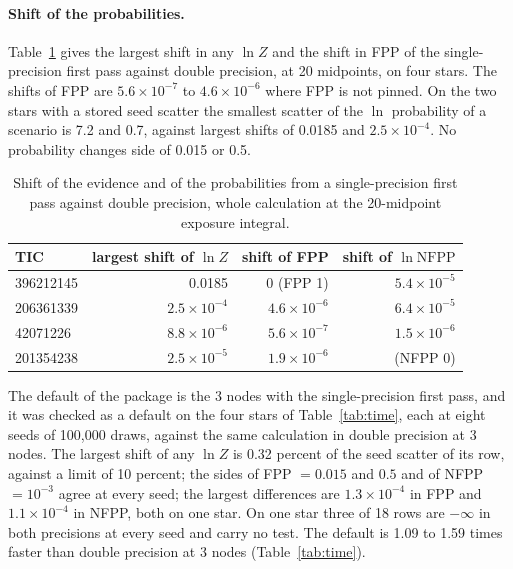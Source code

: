 \documentclass[11pt]{article}
\begin{document}
\paragraph{Shift of the probabilities.} Table~\ref{tab:shift} gives the largest shift in any $\ln Z$ and the shift in FPP of the single-precision first pass against double precision, at 20 midpoints, on four stars. The shifts of FPP are $5.6\times10^{-7}$ to $4.6\times10^{-6}$ where FPP is not pinned. On the two stars with a stored seed scatter the smallest scatter of the $\ln$ probability of a scenario is 7.2 and 0.7, against largest shifts of 0.0185 and $2.5\times10^{-4}$. No probability changes side of 0.015 or 0.5.

\begin{table}[ht]
\centering
\caption{Shift of the evidence and of the probabilities from a single-precision first pass against double precision, whole calculation at the 20-midpoint exposure integral.}\label{tab:shift}
\begin{tabular}{lrrr}
\toprule
TIC & largest shift of $\ln Z$ & shift of FPP & shift of $\ln\mathrm{NFPP}$ \\
\midrule
396212145 & 0.0185 & 0 (FPP 1) & $5.4\times10^{-5}$ \\
206361339 & $2.5\times10^{-4}$ & $4.6\times10^{-6}$ & $6.4\times10^{-5}$ \\
42071226  & $8.8\times10^{-6}$ & $5.6\times10^{-7}$ & $1.5\times10^{-6}$ \\
201354238 & $2.5\times10^{-5}$ & $1.9\times10^{-6}$ & (NFPP 0) \\
\bottomrule
\end{tabular}
\end{table}


The default of the package is the 3 nodes with the single-precision first pass, and it was checked as a default on the four stars of Table~\ref{tab:time}, each at eight seeds of 100,000 draws, against the same calculation in double precision at 3 nodes. The largest shift of any $\ln Z$ is 0.32 percent of the seed scatter of its row, against a limit of 10 percent; the sides of FPP $=0.015$ and $0.5$ and of NFPP $=10^{-3}$ agree at every seed; the largest differences are $1.3\times10^{-4}$ in FPP and $1.1\times10^{-4}$ in NFPP, both on one star. On one star three of 18 rows are $-\infty$ in both precisions at every seed and carry no test. The default is 1.09 to 1.59 times faster than double precision at 3 nodes (Table~\ref{tab:time}).
\end{document}
